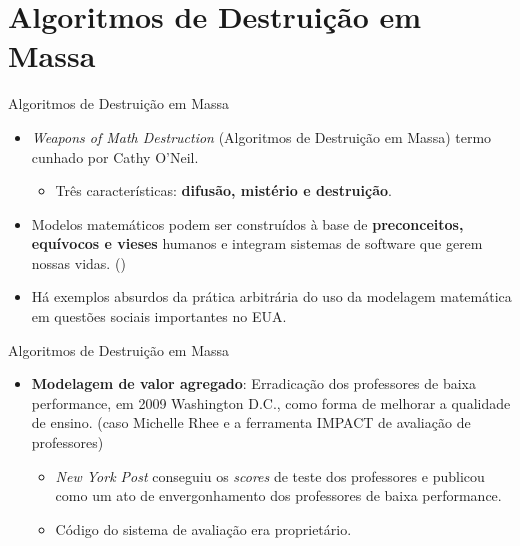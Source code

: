 \documentclass{beamer}
\begin{document}
\section{Algoritmos de Destruição em Massa}

\begin{frame}{Algoritmos de Destruição em Massa}
    \begin{itemize}
        \item \textit{Weapons of Math Destruction} (Algoritmos de Destruição em Massa) termo cunhado por Cathy O'Neil.
        \begin{itemize}
            \item Três características: \textbf{difusão, mistério e destruição}.
        \end{itemize}
        \item Modelos matemáticos podem ser construídos à base de \textbf{preconceitos, equívocos e vieses} humanos e integram sistemas de software que gerem nossas vidas. (\cite{cathy2020})
        \item Há exemplos absurdos da prática arbitrária do uso da modelagem matemática em questões sociais importantes no EUA.
    \end{itemize}    
\end{frame}

\begin{frame}{Algoritmos de Destruição em Massa}
    \begin{itemize}
        \item \textbf{Modelagem de valor agregado}: Erradicação dos professores de baixa performance, em 2009 Washington D.C., como forma de melhorar a qualidade de ensino. (caso Michelle Rhee e a ferramenta IMPACT de avaliação de professores)
        \begin{itemize}
            \item \textit{New York Post} conseguiu os \textit{scores} de teste dos professores e publicou como um ato de envergonhamento dos professores de baixa performance.
            \item Código do sistema de avaliação era proprietário.
        \end{itemize}
    \end{itemize}    
\end{frame}
\end{document}
